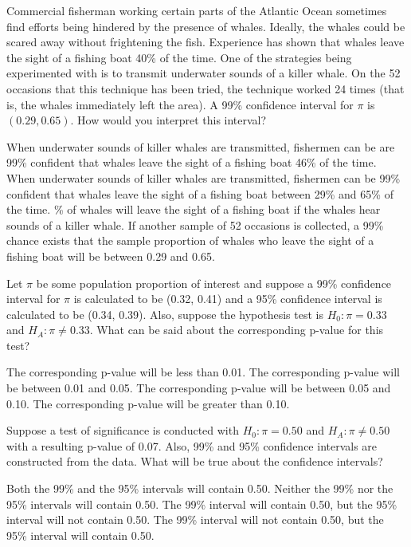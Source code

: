 \documentclass{article}
\begin{document}
\begin{mcquestions}
		\question Commercial fisherman working certain parts of the Atlantic Ocean sometimes find efforts being hindered by the presence of whales. Ideally, the whales could be scared away without frightening the fish. Experience has shown that whales leave the sight of a fishing boat 40\% of the time. One of the strategies being experimented with is to transmit underwater sounds of a killer whale. On the 52 occasions that this technique has been tried, the technique worked 24 times (that is, the whales immediately left the area).
		A 99\% confidence interval for $\pi$ is $(0.29, 0.65)$. How would you interpret this interval?
		\begin{mcanswerslist}
			\answer When underwater sounds of killer whales are transmitted, fishermen can be are 99\% confident that whales leave the sight of a fishing boat 46\% of the time.
			\answer[correct] When underwater sounds of killer whales are transmitted, fishermen can be 99\% confident that whales leave the sight of a fishing boat between 29\% and 65\% of the time.
			\% of whales will leave the sight of a fishing boat if the whales hear sounds of a killer whale.
			\answer If another sample of 52 occasions is collected, a 99\% chance exists that the sample proportion of whales who leave the sight of a fishing boat will be between 0.29 and 0.65.
		\end{mcanswerslist}
		
		\question Let $\pi$ be some population proportion of interest and suppose a 99\% confidence interval for $\pi$ is calculated to be (0.32, 0.41) and a 95\% confidence interval is calculated to be (0.34, 0.39). Also, suppose the hypothesis test is $H_0: \pi = 0.33$ and $H_A: \pi \neq 0.33$. What can be said about the corresponding p-value for this test?
		\begin{mcanswerslist}
			\answer The corresponding p-value will be less than 0.01.
			\answer[correct] The corresponding p-value will be between 0.01 and 0.05.
			\answer The corresponding p-value will be between 0.05 and 0.10.
			\answer The corresponding p-value will be greater than 0.10.
		\end{mcanswerslist}
		
		\question Suppose a test of significance is conducted with $H_0: \pi = 0.50$ and $H_A: \pi \neq 0.50$ with a resulting p-value of 0.07.  Also, 99\% and 95\% confidence intervals are constructed from the data.
		What will be true about the confidence intervals?
		\begin{mcanswerslist}
			\answer[correct] Both the 99\% and the 95\% intervals will contain 0.50.
			\answer Neither the 99\% nor the 95\% intervals will contain 0.50.
			\answer The 99\% interval will contain 0.50, but the 95\% interval will not contain 0.50.
			\answer The 99\% interval will not contain 0.50, but the 95\% interval will contain 0.50.
		\end{mcanswerslist}
		

\end{mcquestions}
\end{document}
